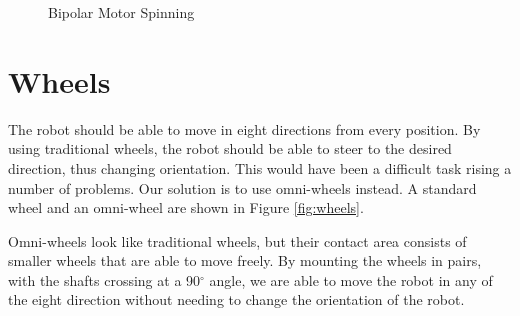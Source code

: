\begin{figure}[htp]
{  		}
  	\hfill
  	\caption{Bipolar Motor Spinning}
  	\label{fig:bipolar_stepping}
\end{figure}
\newpage
\section{Wheels}\label{sec:wheels}
The robot should be able to move in eight directions from every position. By using traditional wheels, the robot should be able to steer to the desired direction, thus changing orientation. This would have been a difficult task rising a number of problems. Our solution is to use omni-wheels instead. A standard wheel and an omni-wheel are shown in Figure \ref{fig:wheels}.

Omni-wheels look like traditional wheels, but their contact area consists of smaller wheels that are able to move freely. By mounting the wheels in pairs, with the shafts crossing at a 90$^\circ$ angle, we are able to move the robot in any of the eight direction without needing to change the orientation of the robot.

